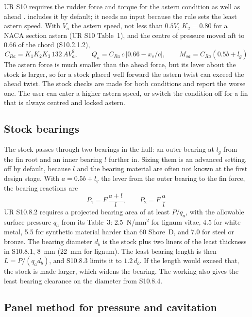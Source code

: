 UR S10 requires the rudder force and torque for the astern condition as well
as ahead \cite{iacsS10}. \NEMO{} includes it by default; it needs no input
because the rule sets the least astern speed. With $V_a$ the astern speed, not
less than $0.5V$, $K_2 = 0.80$ for a NACA section astern (UR S10 Table~1), and
the centre of pressure moved aft to 0.66 of the chord (S10.2.1.2),
\begin{equation}
C_{Ra} = K_1 K_2 K_3\,132\,A V_a^2, \qquad
Q_a = C_{Ra}\,c\,|0.66 - x_s/c|, \qquad
M_{sa} = C_{Ra}(0.5b + l_g)
\label{eq:astern}
\end{equation}
The astern force is much smaller than the ahead force, but its lever about
the stock is larger, so for a stock placed well forward the astern twist can
exceed the ahead twist. The stock checks are made for both conditions and
report the worse one. The user can enter a higher astern speed, or switch the
condition off for a fin that is always centred and locked astern.

\subsection{Stock bearings}
\label{sec:bearings}

The stock passes through two bearings in the hull: an outer bearing at
$l_g$ from the fin root and an inner bearing $l$ further in. Sizing them is an
advanced setting, off by default, because $l$ and the bearing material are
often not known at the first design stage. With $a = 0.5b + l_g$ the lever from
the outer bearing to the fin force, the bearing reactions are
\begin{equation}
P_1 = F\,\frac{a + l}{l}, \qquad P_2 = F\,\frac{a}{l}
\label{eq:bearings}
\end{equation}
UR S10.8.2 requires a projected bearing area of at least $P/q_a$, with the
allowable surface pressure $q_a$ from its Table~3: 2.5~N/mm$^2$ for lignum
vitae, 4.5 for white metal, 5.5 for synthetic material harder than 60 Shore~D,
and 7.0 for steel or bronze. The bearing diameter $d_b$ is the stock plus two
liners of the least thickness in S10.8.1, 8~mm (22~mm for lignum). The least
bearing length is then $L = P/(q_a d_b)$, and S10.8.3 limits it to
$1.2\,d_b$. If the length would exceed that, the stock is made larger, which
widens the bearing. The working also gives the least bearing clearance on the
diameter from S10.8.4.

\subsection{Panel method for pressure and cavitation}

